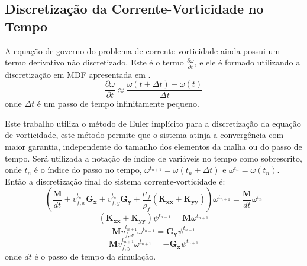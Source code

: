 \subsection{\textbf{Discretização da Corrente-Vorticidade no Tempo}}
A equação de governo  do problema de corrente-vorticidade ainda possui um termo derivativo não discretizado.
Este é o termo $\tfrac{\partial \omega}{\partial t}$, e ele é formado utilizando a discretização em MDF apresentada em .
 \begin{equation}
    \dfrac{\partial \omega}{\partial t} \approx
    \frac{
        \omega(t + \Delta t) -
        \omega(t)
    }{\Delta t}
\end{equation}
onde $\Delta t$ é um passo de tempo infinitamente pequeno.

Este trabalho utiliza o método de Euler implícito para a discretização da equação de vorticidade, este método permite que o sistema atinja a convergência com maior garantia, independente do tamanho dos elementos da malha ou do passo de tempo.
Será utilizada a notação de índice de variáveis no tempo como sobrescrito, onde $t_n$ é o índice do passo no tempo, $\omega^{t_{n+1}} = \omega(t_n + \Delta t)$ e $\omega^{t_{n}} = \omega(t_n)$.
Então a discretização final do sistema corrente-vorticidade é:
\begin{equation}
    \left(
        \dfrac{\mathbf{M}}{dt} +
        v_{f,x}^{t_{n}}
        \mathbf{G_x}+
        v_{f,y}^{t_{n}}
        \mathbf{G_y} +
        \dfrac{\mu_f}{\rho_f}
        \left(
        \mathbf{K_{xx}} +
        \mathbf{K_{yy}}
        \right)
    \right)
    \omega^{t_{n+1}} = 
    \dfrac{\mathbf{M}}{dt}
    \omega^{t_{n}}
    \label{last_w}
\end{equation}
\begin{equation}
    \left(
    \mathbf{K_{xx}} +
    \mathbf{K_{yy}}
    \right)
    \psi^{t_{n+1}} =
    \mathbf{M}
    \omega^{t_{n+1}}
    \label{last_psi}
\end{equation}
\begin{equation}
    \mathbf{M}
    v_{f,x}^{t_{n+1}}
    \omega^{t_{n+1}} =
    \mathbf{G_y}
    \psi^{t_{n+1}}
    \label{last_vx}
\end{equation}
\begin{equation}
    \mathbf{M}
    v_{f,y}^{t_{n+1}}
    \omega^{t_{n+1}} = -
    \mathbf{G_x}
    \psi^{t_{n+1}}
    \label{last_vy}
\end{equation}
onde $dt$ é o passo de tempo da simulação.

